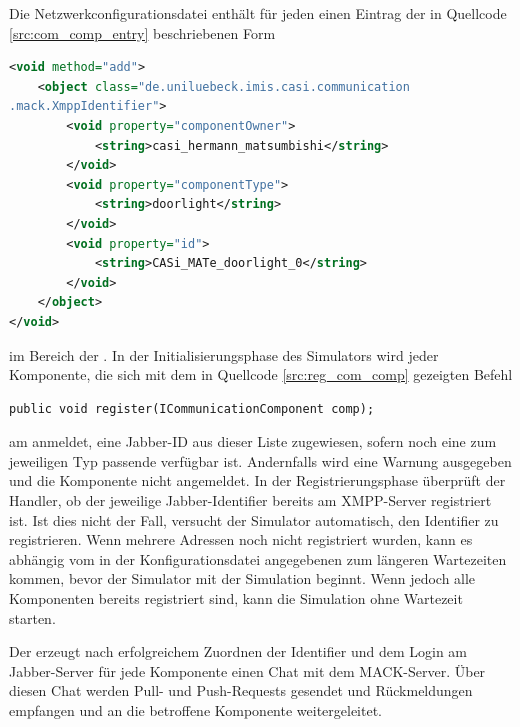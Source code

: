 Die Netzwerkconfigurationsdatei enthält für jeden  einen Eintrag der in Quellcode \ref{src:com_comp_entry} beschriebenen Form
\begin{illfloat}[p]
\begin{lstlisting}[language=XML]
<void method="add">
	<object class="de.uniluebeck.imis.casi.communication
.mack.XmppIdentifier">
		<void property="componentOwner">
			<string>casi_hermann_matsumbishi</string>
		</void>
		<void property="componentType">
			<string>doorlight</string>
		</void>
		<void property="id">
			<string>CASi_MATe_doorlight_0</string>
		</void>
	</object>
</void>
\end{lstlisting}
\label{src:com_comp_entry}
\end{illfloat}
im Bereich der  . In der Initialisierungsphase des Simulators wird jeder Komponente, die sich mit dem in Quellcode \ref{src:reg_com_comp} gezeigten Befehl 
\begin{illfloat}[p]
   \begin{lstlisting}
public void register(ICommunicationComponent comp);
   \end{lstlisting}
\label{src:reg_com_comp}
\end{illfloat}
am  anmeldet, eine Jabber-ID aus dieser Liste zugewiesen, sofern noch eine zum jeweiligen Typ passende verfügbar ist. Andernfalls wird eine Warnung ausgegeben und die Komponente nicht angemeldet.
In der Registrierungsphase überprüft der Handler, ob der jeweilige Jabber-Identifier bereits am XMPP-Server registriert ist. Ist dies nicht der Fall, versucht der Simulator automatisch, den Identifier zu registrieren. Wenn mehrere Adressen noch nicht registriert wurden, kann es abhängig vom in der Konfigurationsdatei angegebenen  zum längeren Wartezeiten kommen, bevor der Simulator mit der Simulation beginnt. Wenn jedoch alle Komponenten bereits registriert sind, kann die Simulation ohne Wartezeit starten.

Der  erzeugt nach erfolgreichem Zuordnen der Identifier und dem Login am Jabber-Server für jede Komponente einen Chat mit dem MACK-Server. Über diesen Chat werden Pull- und Push-Requests gesendet und Rückmeldungen empfangen und an die betroffene Komponente weitergeleitet.

